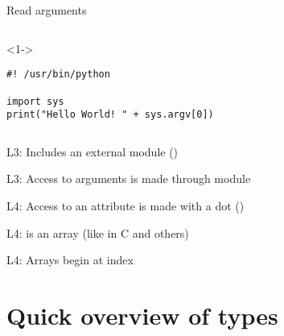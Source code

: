 \begin{frame}[fragile]{Read arguments}

  \begin{columns}[onlytextwidth]
    \begin{column}{\textwidth}
      \begin{onlyenv}<1->
        \begin{lstlisting}[style=python]
#! /usr/bin/python

import sys
print("Hello World! " + sys.argv[0]) \end{lstlisting}
      \end{onlyenv}
    \end{column}
  \end{columns}

   L3: Includes an external module ()

   L3: Access to arguments is made through  module

   L4: Access to an attribute is made with a dot ()

   L4:  is an array (like in C and others)

   L4: Arrays begin at index 

\end{frame}


\section{Quick overview of types}



